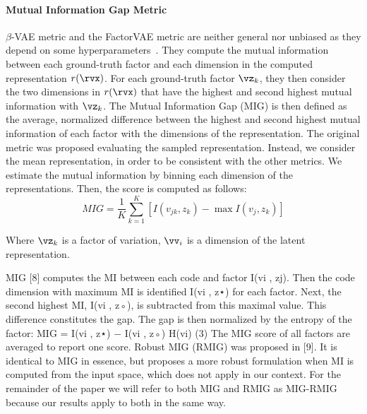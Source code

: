 \documentclass{article} %
\theoremstyle{plain}
\theoremstyle{definition}
\theoremstyle{remark}
\numberwithin{equation}{section}
\begin{document}
\paragraph{Mutual Information Gap Metric \citep{chen_isolating_2018}}
$\beta$-VAE metric and the FactorVAE metric are neither general nor unbiased as they depend on some hyperparameters~\citep{chen_isolating_2018}. They compute the mutual information between each ground-truth factor and each dimension in the computed representation $r(\rvx)$. For each ground-truth factor $\vz_k$, they then consider the two dimensions in $r(\rvx)$ that have the highest and second highest mutual information with $\vz_k$. The Mutual Information Gap (MIG) is then defined as the average, normalized difference between the highest and second highest mutual information of each factor with the dimensions of the representation. The original metric was proposed evaluating the sampled representation. Instead, we consider the mean representation, in order to be consistent with the other metrics. We estimate the mutual information by binning each dimension of the representations. Then, the score is computed as follows:
\[
MIG = \frac{1}{K} \sum_{k=1}^{K} \left[ I(v_{jk},z_k) - \max I(v_j,z_k) \right]
\]

Where $\vz_k$ is a factor of variation, $\vv_i$ is a dimension of the latent representation.

MIG [8] computes the MI between each code and factor I(vi
, zj). Then the code dimension with maximum MI is
identified I(vi
, z⋆) for each factor. Next, the second highest MI, I(vi
, z◦), is subtracted from this maximal value. This
difference constitutes the gap. The gap is then normalized by the entropy of the factor:
MIG =
I(vi
, z⋆) − I(vi
, z◦)
H(vi)
(3)
The MIG score of all factors are averaged to report one score.
Robust MIG (RMIG) was proposed in [9]. It is identical to MIG in essence, but proposes a more robust formulation
when MI is computed from the input space, which does not apply in our context. For the remainder of the paper we
will refer to both MIG and RMIG as MIG-RMIG because our results apply to both in the same way.
\end{document}
